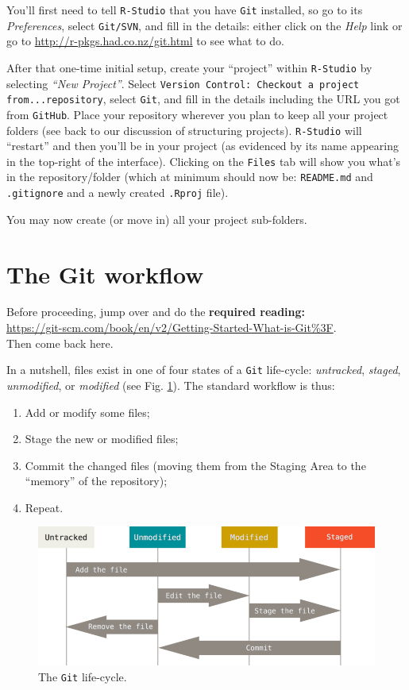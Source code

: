 \documentclass[12pt,letterpaper]{article}
\begin{document}
You'll first need to tell \texttt{R-Studio} that you have \texttt{Git} installed, 
so go to its \textit{Preferences}, 
select \texttt{Git/SVN},
and fill in the details: 
either click on the \textit{Help} link 
or go to \url{http://r-pkgs.had.co.nz/git.html} to see what to do.

After that one-time initial setup,
create your ``project'' within  \texttt{R-Studio} by selecting \textit{``New Project''}.
Select \texttt{Version Control: Checkout a project from...repository}, 
select \texttt{Git}, 
and fill in the details including the URL you got from \texttt{GitHub}.
Place your repository wherever you plan to keep all your project folders 
(see back to our discussion of structuring projects).
\texttt{R-Studio} will ``restart'' and then you'll be in your project
(as evidenced by its name appearing in the top-right of the interface).
Clicking on the \texttt{Files} tab will show you what's in the repository/folder
(which at minimum should now be:
\texttt{README.md} and \texttt{.gitignore} and a newly created \texttt{.Rproj} file).

You may now create (or move in) all your project sub-folders.




\section{The Git workflow}
Before proceeding, jump over and do the \textbf{required reading:}\\
\url{https://git-scm.com/book/en/v2/Getting-Started-What-is-Git%3F}.\\
Then come back here.

In a nutshell, 
files exist in one of four states of a \texttt{Git} life-cycle: 
\emph{untracked}, \emph{staged}, \emph{unmodified}, or \emph{modified}
(see Fig. \ref{fig:lifecycle}).
The standard workflow is thus:
\begin{enumerate}
	\item Add or modify some files;
	\item Stage the new or modified files;
	\item Commit the changed files
	(moving them from the Staging Area to the ``memory'' of the repository);
	\item Repeat.
\end{enumerate}

\begin{figure}
	\includegraphics[width=\linewidth]{figs/lifecycle}
	\caption{The \texttt{Git} life-cycle.}
	\label{fig:lifecycle}
\end{figure}
\end{document}
